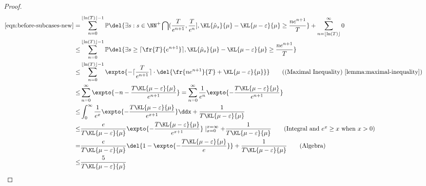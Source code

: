 \begin{proof}
            \begin{align*}
            \eqref{eqn:before-subcases-new} 
            =&
            \sum_{n=0}^{\lfloor \ln(T)\rfloor - 1}
                \mathbb{P}\del{
                \exists s: 
                    s \in \NN^+ \bigcap (\frac{T}{e^{n+1}}, \frac{T}{e^n}],
                        \KL{\hmu_s}{\mu} - \KL{\mu-\varepsilon}{\mu} \geq \frac{n e^{n+1}}{T}
                }
            +
            \sum_{n=\lfloor \ln(T)\rfloor}^\infty
                0
            \\
            \leq&
            \sum_{n=0}^{\lfloor \ln(T)\rfloor - 1}
                \mathbb{P}\del{
                    \exists s \geq \lceil \fr{T}{e^{n+1}} \rceil,
                        \KL{\hmu_s}{\mu} - \KL{\mu-\varepsilon}{\mu} \geq \frac{n e^{n+1}}{T}
                }
            \\
            \leq& \sum_{n=0}^{\lfloor \ln(T)\rfloor - 1}
                \expto{ 
                    - \lceil \frac{T}{e^{n+1}} \rceil
                    \cdot \del{
                        \fr{n e^{n+1}}{T} +
                        \KL{\mu-\varepsilon}{\mu}
                    }
                }
                    \tag{(Maximal Inequality) \Cref{lemma:maximal-inequality}}
            \\
            \leq& \sum_{n=0}^\infty
                \expto{ -n -  \frac{T \KL{\mu-\varepsilon}{\mu}}{e^{n+1}}}
            = \sum_{n=0}^\infty
                \frac{1}{e^{n}}
                \expto{ - \frac{T \KL{\mu-\varepsilon}{\mu}}{e^{n+1}}}
            \\
            \leq &
                \int_{0}^\infty
                \frac{1}{e^{x}}
                \expto{ - \frac{T \KL{\mu-\varepsilon}{\mu}}{e^{x+1}}} \ddx
                +
                \frac{1}{T \KL{\mu-\varepsilon}{\mu}}
            \\
            \leq &
                \frac{e}{T \KL{\mu-\varepsilon}{\mu}} \expto{-\frac{T\KL{\mu-\varepsilon}{\mu}}{e^{x+1}}} \mid_{x=0}^{x=\infty}
                +
                \frac{1}{T \KL{\mu-\varepsilon}{\mu}}
                    \tag{Integral and $e^x \geq x$ when $x > 0$}
            \\
            =& 
                \frac{e}{T \KL{\mu-\varepsilon}{\mu} } \del{1 - \expto{-\frac{T \KL{\mu-\varepsilon}{\mu}}{e}}} + \frac{1}{T \KL{\mu-\varepsilon}{\mu} }
                    \tag{Algebra}
            \\
            \leq&
                \frac{5}{T \KL{\mu-\varepsilon}{\mu} }
        \end{align*}
                

\end{proof}

